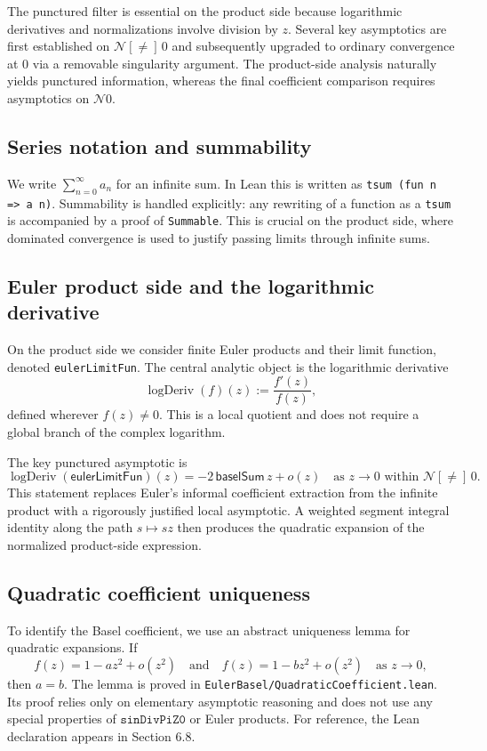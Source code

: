 \documentclass[11pt,a4paper]{article}
\theoremstyle{plain}
\theoremstyle{definition}
\DeclareRobustCommand{\codepath}[1]{\nolinkurl{#1}}
\newcommand{\nhds}{\ensuremath{\mathcal{N}}}
\newcommand{\nhdsPunct}[1]{\ensuremath{\mathcal{N}[{\neq}]\,#1}}
\DeclareRobustCommand{\leanid}[1]{\texttt{#1}}
\DeclareRobustCommand{\codepath}[1]{\nolinkurl{#1}}
\newcommand{\baselSum}{\ensuremath{\mathsf{baselSum}}}
\newcommand{\sinDivPiZZero}{\leanid{sinDivPiZ0}}
\newcommand{\eulerLimitFun}{\ensuremath{\mathsf{eulerLimitFun}}}
\DeclareMathOperator{\logDeriv}{logDeriv}
\begin{document}
The punctured filter is essential on the product side because logarithmic derivatives and normalizations involve division by $z$. Several key asymptotics are first established on $\nhdsPunct{0}$ and subsequently upgraded to ordinary convergence at $0$ via a removable singularity argument. The product-side analysis naturally yields punctured information, whereas the final coefficient comparison requires asymptotics on $\nhds 0$.

\subsection{Series notation and summability}

We write $\sum_{n=0}^{\infty} a_{n}$ for an infinite sum.
In Lean this is written as \texttt{tsum (fun n => a n)}.
Summability is handled explicitly: any rewriting of a function as a
\texttt{tsum} is accompanied by a proof of \texttt{Summable}.
This is crucial on the product side, where dominated convergence is used
to justify passing limits through infinite sums.

\subsection{Euler product side and the logarithmic derivative}

On the product side we consider finite Euler products and their limit function, denoted \texttt{eulerLimitFun}. The central analytic object is the logarithmic derivative
\[
\logDeriv(f)(z) := \frac{f'(z)}{f(z)},
\]
defined wherever $f(z) \neq 0$. This is a local quotient and does not require a global branch of the complex logarithm.

The key punctured asymptotic is
\[
\logDeriv(\eulerLimitFun)(z)
= -2\,\baselSum\,z + o(z)
\quad \text{as } z \to 0 \text{ within } \nhdsPunct{0}.
\]
This statement replaces Euler’s informal coefficient extraction from the infinite product with a rigorously justified local asymptotic. A weighted segment integral identity along the path \(s \mapsto s z\) then produces the quadratic expansion of the normalized product-side expression.

\subsection{Quadratic coefficient uniqueness}

To identify the Basel coefficient, we use an abstract uniqueness lemma for quadratic expansions. If
\[
f(z) = 1 - a z^{2} + o(z^{2})
\quad \text{and} \quad
f(z) = 1 - b z^{2} + o(z^{2})
\quad \text{as } z \to 0,
\]
then $a = b$. The lemma is proved in \codepath{EulerBasel/QuadraticCoefficient.lean}. Its proof relies only on elementary asymptotic reasoning and does not use any special properties of $\sinDivPiZZero$ or Euler products. For reference, the Lean declaration appears in Section 6.8.
\end{document}
